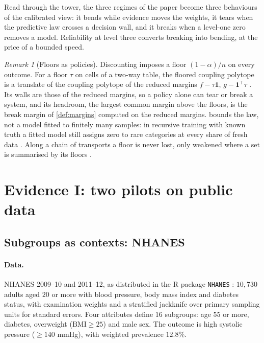 \documentclass[11pt]{article}
\theoremstyle{definition}
\theoremstyle{remark}
\newtheorem{remark}[theorem]{Remark}
\begin{document}
Read through the tower, the three regimes of the paper become three behaviours of the calibrated view: it bends while evidence moves
the weights, it tears when the predictive law crosses a decision wall, and it breaks when a level-one zero removes a model. Reliability at
level three converts breaking into bending, at the price of a bounded speed.

\begin{remark}[Floors as policies]\label{rem:floorpolicy}
Discounting imposes a floor $(1-\alpha)/n$ on every outcome. For a floor $\tau$ on cells of a two-way table, the floored coupling
polytope is a translate of the coupling polytope of the reduced margins $f-\tau\mathbf 1$, $g-\mathbf 1^\top\tau$ \cite[Prop.~6.9]{Conditionals}.
Its walls are those of the reduced margins, so a policy alone can tear or break a system, and its headroom, the largest common
margin above the floors, is the break margin of \cref{def:margins} computed on the reduced margins.  bounds the law,
not a model fitted to finitely many samples: in recursive training with known truth a fitted model still assigns zero to rare
categories at every share of fresh data \cite[Section~13]{Validation}. Along a chain of transports a floor is never lost, only
weakened where a set is summarised by its floors \cite[Thm.~10.26]{Tower}.
\end{remark}

\section{Evidence I: two pilots on public data}\label{sec:pilots}

\subsection{Subgroups as contexts: NHANES}\label{sec:nhanes}

\paragraph{Data.} NHANES 2009--10 and 2011--12, as distributed in the R package \texttt{NHANES} \cite{NHANESpkg}: $10{,}730$ adults
aged $20$ or more with blood pressure, body mass index and diabetes status, with examination weights and a stratified jackknife
over primary sampling units for standard errors. Four attributes define $16$ subgroups: age $55$ or more, diabetes, overweight
($\mathrm{BMI}\ge25$) and male sex. The outcome is high systolic pressure ($\ge140$ mmHg), with weighted prevalence $12.8\%$.
\end{document}

